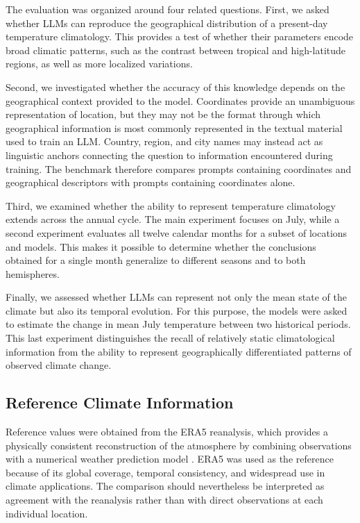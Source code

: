 The evaluation was organized around four related questions. First, we asked whether LLMs can reproduce the geographical distribution of a present-day temperature climatology. This provides a test of whether their parameters encode broad climatic patterns, such as the contrast between tropical and high-latitude regions, as well as more localized variations.

Second, we investigated whether the accuracy of this knowledge depends on the geographical context provided to the model. Coordinates provide an unambiguous representation of location, but they may not be the format through which geographical information is most commonly represented in the textual material used to train an LLM. Country, region, and city names may instead act as linguistic anchors connecting the question to information encountered during training. The benchmark therefore compares prompts containing coordinates and geographical descriptors with prompts containing coordinates alone.

Third, we examined whether the ability to represent temperature climatology extends across the annual cycle. The main experiment focuses on July, while a second experiment evaluates all twelve calendar months for a subset of locations and models. This makes it possible to determine whether the conclusions obtained for a single month generalize to different seasons and to both hemispheres.

Finally, we assessed whether LLMs can represent not only the mean state of the climate but also its temporal evolution. For this purpose, the models were asked to estimate the change in mean July temperature between two historical periods. This last experiment distinguishes the recall of relatively static climatological information from the ability to represent geographically differentiated patterns of observed climate change.


\subsection{Reference Climate Information}

Reference values were obtained from the ERA5 reanalysis, which provides a physically consistent reconstruction of the atmosphere by combining observations with a numerical weather prediction model \citep{hersbach_era5_2020}. ERA5 was used as the reference because of its global coverage, temporal consistency, and widespread use in climate applications. The comparison should nevertheless be interpreted as agreement with the reanalysis rather than with direct observations at each individual location.

